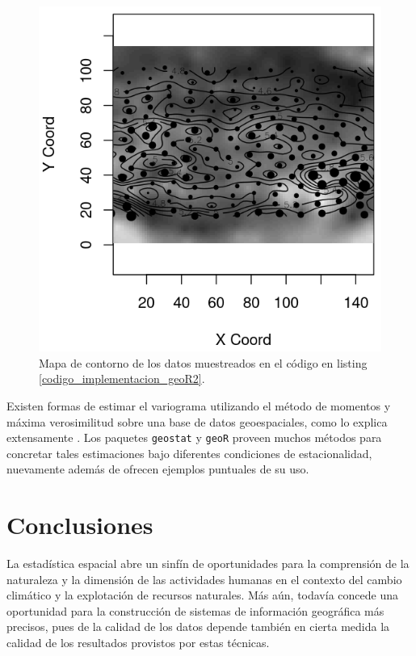 \documentclass[14pt]{extarticle}
\begin{document}
\begin{figure}[h]
	\centering
	\includegraphics[scale=1.0]{proyecto_kriging/Rplot_mapa_contorno.png}\caption{Mapa de contorno de los datos muestreados en el código en listing \ref{codigo_implementacion_geoR2}.}\label{mapa_contorno_geoR}
\end{figure}

Existen formas de estimar el variograma utilizando el método de momentos y máxima verosimilitud sobre una base de datos geoespaciales, como lo explica extensamente \cite{Brus.2022}. Los paquetes \verb|geostat| y \verb|geoR| proveen muchos métodos para concretar tales estimaciones bajo diferentes condiciones de estacionalidad, nuevamente \cite{Brus.2022} además de \cite{Benedetti.2015} ofrecen ejemplos puntuales de su uso. 

\newpage
\section{Conclusiones}
La estadística espacial abre un sinfín de oportunidades para la comprensión de la naturaleza y la dimensión de las actividades humanas en el contexto del cambio climático y la explotación de recursos naturales. Más aún, todavía concede una oportunidad para la construcción de sistemas de información geográfica más precisos, pues de la calidad de los datos depende también en cierta medida la calidad de los resultados provistos por estas técnicas. 
\end{document}

